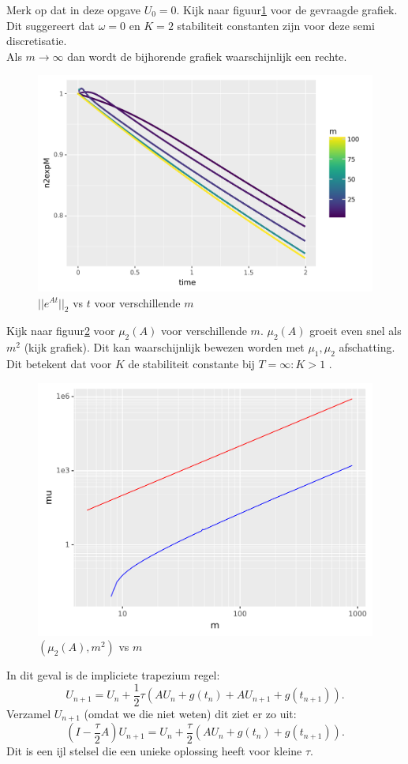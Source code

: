 \documentclass{article}
\begin{document}
Merk op dat in deze opgave $U_{0}=0$.
Kijk naar figuur\ref{fig:mnexp} voor de gevraagde grafiek. Dit suggereert 
dat $\omega = 0$ en $K = 2$ stabiliteit constanten
zijn voor deze semi discretisatie. \\
Als $m \rightarrow \infty$ dan wordt de bijhorende grafiek waarschijnlijk
een rechte.

\begin{figure}
\includegraphics[width=\linewidth]{oefening2.png}
\caption{ $||e^{At}||_{2}$ vs $t$ voor verschillende $m$}\label{fig:mnexp}
\end{figure}

Kijk naar figuur\ref{fig:muA} voor $\mu_{2}(A)$ voor verschillende $m$. 
$\mu_{2}(A)$ groeit even snel als $m^{2}$ (kijk grafiek). Dit kan waarschijnlijk
bewezen worden met $\mu_{1}, \mu_{2}$ afschatting. Dit betekent dat voor  
$K$ de stabiliteit constante bij $T = \infty: K > 1$ .

\begin{figure}
\includegraphics[width=\linewidth]{oefening3.png}
\caption{ $(\mu_{2}(A), m^2)$ vs $m$}\label{fig:muA}
\end{figure}

In dit geval is de impliciete trapezium regel:
\[
  U_{n+1} = U_{n} + \frac{1}{2} \tau (A U_{n} + g(t_{n}) + A U_{n+1} + g(t_{n+1}))
.\]
Verzamel $U_{n+1}$ (omdat we die niet weten) dit ziet er zo uit:
\[
  (I-\frac{\tau}{2}A)U_{n+1} = U_{n} + \frac{\tau}{2} (AU_{n} + g(t_{n})+ g(t_{n+1}))
.\]
Dit is een ijl stelsel die een unieke oplossing heeft voor kleine $\tau$.
\end{document}
